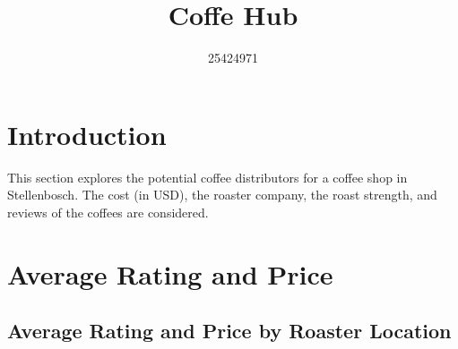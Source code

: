 \documentclass[11pt,preprint]{elsarticle}
\numberwithin{equation}{section}
\numberwithin{figure}{section}
\numberwithin{table}{section}
\begin{document}
\begin{frontmatter}  %

\title{Coffe Hub}





\author[Add1]{25424971}








\vspace{1cm}





\vspace{0.5cm}

\end{frontmatter}

\setcounter{footnote}{0}



\pagestyle{fancy}
\chead{}
\rhead{}
\lfoot{}
\lhead{}
\cfoot{}


\headsep 35pt %




\section{Introduction}\label{introduction}

This section explores the potential coffee distributors for a coffee
shop in Stellenbosch. The cost (in USD), the roaster company, the roast
strength, and reviews of the coffees are considered.

\section{Average Rating and Price}\label{average-rating-and-price}

\subsection{Average Rating and Price by Roaster
Location}\label{average-rating-and-price-by-roaster-location}
\end{document}
